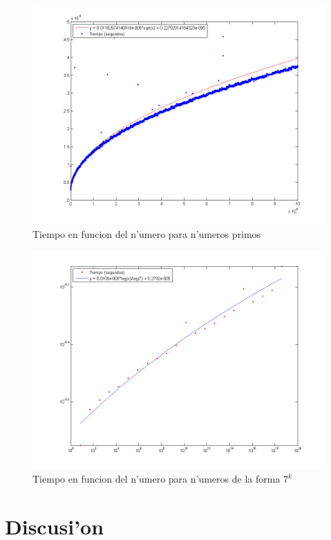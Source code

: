 \begin{figure}[H]
\centering
\includegraphics[scale=0.5]{../../codigo/ejercicio1/benchmark_de_tiempo/graficos/primos/primosTiempo.png}
\caption{Tiempo en funcion del n'umero para n'umeros primos}
\end{figure}

\begin{figure}[H]
\centering
\includegraphics[scale=0.5]{../../codigo/ejercicio1/benchmark_de_tiempo/graficos/potencias_de_7/Potencias_de_7_tiempo.png}
\caption{Tiempo en funcion del n'umero para n'umeros de la forma $7^k$}
\end{figure}

\section{Discusi'on}


